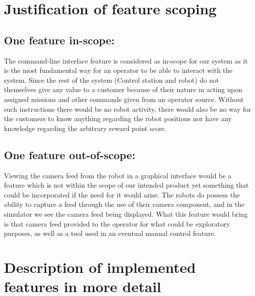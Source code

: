 

\section{Justification of feature scoping}

\subsection{One feature in-scope:}
The command-line interface feature is considered as in-scope for our system as it is the most fundamental way for an operator to be able to interact with the system. Since the rest of the system (Control station and robot) do not themselves give any value to a customer because of their nature in acting upon assigned missions and other commands given from an operator source. Without such instructions there would be no robot activity, there would also be no way for the customers to know anything regarding the robot positions nor have any knowledge regarding the arbitrary reward point score.

\subsection{One feature out-of-scope:}
Viewing the camera feed from the robot in a graphical interface would be a feature which is not within the scope of our intended product yet something that could be incorporated if the need for it would arise. The robots do possess the ability to capture a feed through the use of their camera component, and in the simulator we see the camera feed being displayed. What this feature would bring is that camera feed provided to the operator for what could be exploratory purposes, as well as a tool used in an  eventual manual control feature.



\section{Description of implemented features in more detail}

